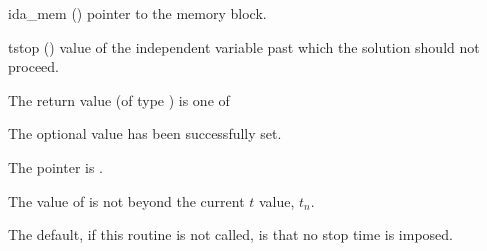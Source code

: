 {{}
{
  \begin{args}
  \item[ida\_mem] ()
    pointer to the {\idas} memory block.
  \item[tstop] ()
    value of the independent variable past which the solution should
    not proceed.
  \end{args}
}
{
  The return value  (of type ) is one of
  \begin{args}
  \item[\Id{IDA\_SUCCESS}]
    The optional value has been successfully set.
  \item[\Id{IDA\_MEM\_NULL}]
    The  pointer is .
  \item[\Id{IDA\_ILL\_INPUT}]
    The value of  is not beyond the current $t$ value, $t_n$.
  \end{args}
}
{
  The default, if this routine is not called, is that no stop time is imposed.

}}
